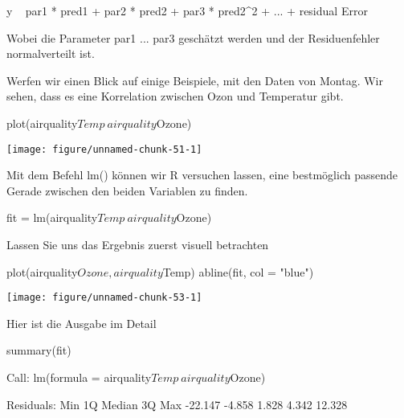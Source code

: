 \documentclass[a4paper,twoside]{tufte-book}\usepackage[]{graphicx}\usepackage[]{color}
\makeatletter
\def\maxwidth{ %
	\ifdim\Gin@nat@width>\linewidth
	\linewidth
	\else
	\Gin@nat@width
	\fi
}
\makeatother
\begin{document}
\begin{appendices}
\begin{Schunk}
\begin{Sinput}
y ~ par1 * pred1 +  par2 * pred2 +  par3 * pred2^2 + ... + residual Error
\end{Sinput}
\end{Schunk}

Wobei die Parameter par1 ... par3 geschätzt werden und der Residuenfehler normalverteilt ist.

Werfen wir einen Blick auf einige Beispiele, mit den Daten von Montag. Wir sehen, dass es eine Korrelation zwischen Ozon und Temperatur gibt.

\begin{Schunk}
\begin{Sinput}
plot(airquality$Temp~airquality$Ozone)
\end{Sinput}

\texttt{[image: figure/unnamed-chunk-51-1]} \end{Schunk}

Mit dem Befehl lm() können wir R versuchen lassen, eine bestmöglich passende Gerade zwischen den beiden Variablen zu finden.

\begin{Schunk}
\begin{Sinput}
fit = lm(airquality$Temp~airquality$Ozone)
\end{Sinput}
\end{Schunk}

Lassen Sie uns das Ergebnis zuerst visuell betrachten

\begin{Schunk}
\begin{Sinput}
plot(airquality$Ozone, airquality$Temp)
abline(fit, col = "blue")
\end{Sinput}

\texttt{[image: figure/unnamed-chunk-53-1]} \end{Schunk}

Hier ist die Ausgabe im Detail

\begin{Schunk}
\begin{Sinput}
summary(fit)
\end{Sinput}
\begin{Soutput}

Call:
lm(formula = airquality$Temp ~ airquality$Ozone)

Residuals:
    Min      1Q  Median      3Q     Max 
-22.147  -4.858   1.828   4.342  12.328 


\end{Soutput}
\end{Schunk}
\end{appendices}
\end{document}
